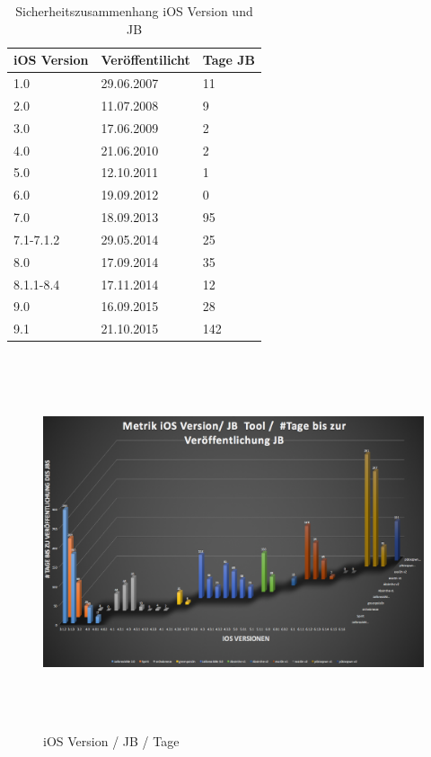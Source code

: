 \begin{table}[htp!]
    \begin{center}
        \begin{tabular}{|l|l|l|} \hline
         \textbf{iOS Version} & \textbf{Veröffentilicht} & \textbf{Tage JB}\\ \hline    
        1.0 & 29.06.2007 & 11\\ \hline 
        2.0 & 11.07.2008	& 9\\ \hline 
        3.0 & 17.06.2009	& 2\\ \hline 
        4.0 & 21.06.2010 & 2\\ \hline 
        5.0 & 12.10.2011	& 1\\ \hline 
        6.0 & 19.09.2012	& 0\\ \hline 
        7.0 & 18.09.2013	& 95\\ \hline 
        7.1-7.1.2 & 29.05.2014 & 25\\ \hline 
        8.0 & 17.09.2014	& 35\\ \hline 
        8.1.1-8.4 & 17.11.2014	& 12\\ \hline 
        9.0 & 16.09.2015	& 28\\ \hline 
        9.1 & 21.10.2015	& 142\\ \hline 
        \end{tabular} 
        \caption{Sicherheitszusammenhang iOS Version und JB}
        \label{tab:iOSVersion}
    \end{center}
\end{table}
         
\begin{figure}[htbp]
        \centering
                \includegraphics[height=11cm]{Bilder/Frage1_1.png}
        \caption{iOS Version / JB / Tage}
        \label{fig:AnalyseiOSJB1}        
\end{figure}

